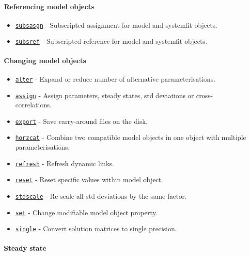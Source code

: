 \paragraph{Referencing model objects}

\begin{itemize}
\itemsep1pt\parskip0pt
\item
  \href{model/subsasgn}{\texttt{subsasgn}} - Subscripted assignment for
  model and systemfit objects.
\item
  \href{model/subsref}{\texttt{subsref}} - Subscripted reference for
  model and systemfit objects.
\end{itemize}

\paragraph{Changing model objects}

\begin{itemize}
\itemsep1pt\parskip0pt
\item
  \href{model/alter}{\texttt{alter}} - Expand or reduce number of
  alternative parameterisations.
\item
  \href{model/assign}{\texttt{assign}} - Assign parameters, steady
  states, std deviations or cross-correlations.
\item
  \href{model/export}{\texttt{export}} - Save carry-around files on the
  disk.
\item
  \href{model/horzcat}{\texttt{horzcat}} - Combine two compatible model
  objects in one object with multiple parameterisations.
\item
  \href{model/refresh}{\texttt{refresh}} - Refresh dynamic links.
\item
  \href{model/reset}{\texttt{reset}} - Reset specific values within
  model object.
\item
  \href{model/stdscale}{\texttt{stdscale}} - Re-scale all std deviations
  by the same factor.
\item
  \href{model/set}{\texttt{set}} - Change modifiable model object
  property.
\item
  \href{model/single}{\texttt{single}} - Convert solution matrices to
  single precision.
\end{itemize}

\paragraph{Steady state}

